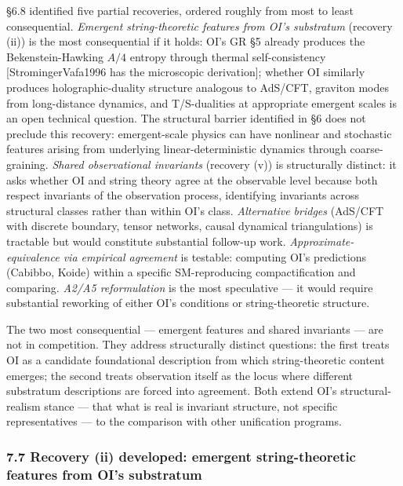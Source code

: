 \documentclass[
]{article}
\begin{document}
§6.8 identified five partial recoveries, ordered roughly from most to
least consequential. \emph{Emergent string-theoretic features from OI's
substratum} (recovery (ii)) is the most consequential if it holds: OI's
GR §5 already produces the Bekenstein-Hawking \(A/4\) entropy through
thermal self-consistency {[}StromingerVafa1996 has the microscopic
derivation{]}; whether OI similarly produces holographic-duality
structure analogous to AdS/CFT, graviton modes from long-distance
dynamics, and T/S-dualities at appropriate emergent scales is an open
technical question. The structural barrier identified in §6 does not
preclude this recovery: emergent-scale physics can have nonlinear and
stochastic features arising from underlying linear-deterministic
dynamics through coarse-graining. \emph{Shared observational invariants}
(recovery (v)) is structurally distinct: it asks whether OI and string
theory agree at the observable level because both respect invariants of
the observation process, identifying invariants across structural
classes rather than within OI's class. \emph{Alternative bridges}
(AdS/CFT with discrete boundary, tensor networks, causal dynamical
triangulations) is tractable but would constitute substantial follow-up
work. \emph{Approximate-equivalence via empirical agreement} is
testable: computing OI's predictions (Cabibbo, Koide) within a specific
SM-reproducing compactification and comparing. \emph{A2/A5
reformulation} is the most speculative --- it would require substantial
reworking of either OI's conditions or string-theoretic structure.

The two most consequential --- emergent features and shared invariants
--- are not in competition. They address structurally distinct
questions: the first treats OI as a candidate foundational description
from which string-theoretic content emerges; the second treats
observation itself as the locus where different substratum descriptions
are forced into agreement. Both extend OI's structural-realism stance
--- that what is real is invariant structure, not specific
representatives --- to the comparison with other unification programs.

\hypertarget{recovery-ii-developed-emergent-string-theoretic-features-from-ois-substratum}{%
\subsubsection{7.7 Recovery (ii) developed: emergent string-theoretic
features from OI's
substratum}\label{recovery-ii-developed-emergent-string-theoretic-features-from-ois-substratum}}
\end{document}
